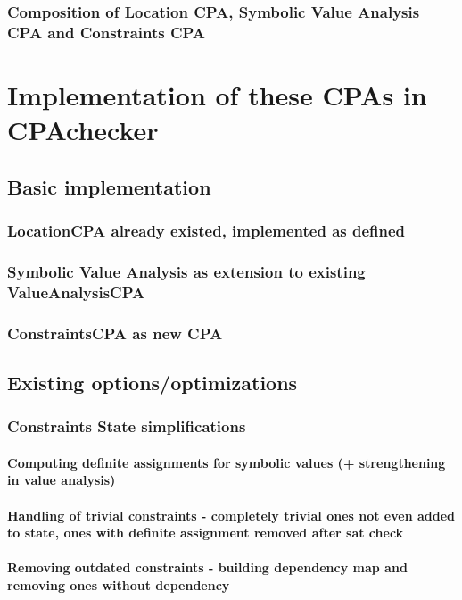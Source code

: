 \documentclass[a4paper,11pt]{article}
\begin{document}
\subsubsection{Composition of Location CPA, Symbolic Value Analysis CPA and Constraints CPA}

\section{Implementation of these CPAs in CPAchecker}
\subsection{Basic implementation}
\subsubsection{LocationCPA already existed, implemented as defined}
\subsubsection{Symbolic Value Analysis as extension to existing ValueAnalysisCPA}
\subsubsection{ConstraintsCPA as new CPA}
\subsection{Existing options/optimizations}
\subsubsection{Constraints State simplifications}
\paragraph{Computing definite assignments for symbolic values (+ strengthening in value analysis)}
\paragraph{Handling of trivial constraints - completely trivial ones not even added to state, ones with definite assignment removed after sat check}
\paragraph{Removing outdated constraints - building dependency map and removing ones without dependency}
\end{document}
